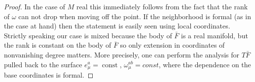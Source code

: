 \documentclass[10pt,a4paper]{amsart}
\def\const{\mathop\mathrm{const}\nolimits}
\begin{document}
\begin{proof}
In the case of $M$ real this immediately follows from the fact that the rank of $\omega$ can not drop when moving off the point. If the neighborhood is formal (as in the case at hand) then
the statement is easily seen using local coordinates. Strictly speaking our case is mixed because the body of $\bar F$ is a real manifold, but the rank is constant on the body  of $\bar F$ so only extension in coordinates of nonvanishing degree matters. More precisely, one can perform the analysis for $T\bar F$
pulled back to the surface $e^a_\mu=\const$, $\omega_\mu^{ab}=const$, where the dependence on the base coordinates is formal.  
\end{proof}
\end{document}
